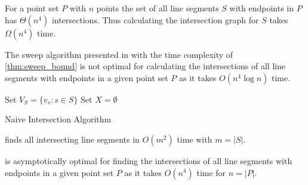 
\begin{theorem}
  \label{thm:point_set_intersections}
  For a point set \(P\) with \(n\) points the set of all line 
  segments \(S\) with endpoints in \(P\) has \(\Theta(n^4)\) 
  intersections. \cite{quadrilaterals_bound} Thus calculating the
  intersection graph for \(S\)  takes \(\Omega(n^4)\) time.
\end{theorem}


\begin{theorem}
  The sweep algorithm presented in \cite[Section 2.1]{deberg_compgeom}
  with the time complexity of \cref{thm:sweep_bound} is not optimal
  for calculating the intersections of all line segments with
  endpoints in a given point set \(P\) as it takes \(O(n^4 \log n)\)
  time.
\end{theorem}


\begin{algorithm}
  \DontPrintSemicolon
  
  
  Set \(V_S = \{v_s : s \in S\} \) \;
  Set \(X = \emptyset\) \;
  \caption{\label{alg:naive_intersection}Naive Intersection Algorithm}
\end{algorithm}


\begin{theorem}
   finds all intersecting line segments
  in \(O(m^2)\) time with \(m = |S|\).  
\end{theorem}


\begin{theorem}
   is asymptotically optimal for finding
  the intersections of all line segments with endpoints in a given
  point set \(P\) as it takes \(O(n^4)\) time for \(n = |P|\).
\end{theorem}

